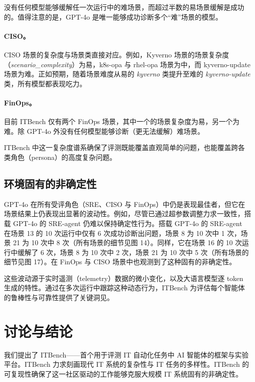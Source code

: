 没有任何模型能够缓解任一次运行中的难场景，而超过半数的易场景缓解是成功的。值得注意的是，GPT-4o 是唯一能够成功诊断多个“难”场景的模型。

\paragraph{CISO。} CISO 场景的复杂度与场景类直接对应。例如，Kyverno 场景的场景复杂度（\textit{scenario\_complexity}）为易，k8s-opa 与 rhel-opa 场景为中，而 kyverno-update 场景为难。正如预期，随着场景难度从易的 \textit{kyverno} 类提升至难的 \textit{kyverno-update} 类，所有模型都表现吃力。

\paragraph{FinOps。} 目前 ITBench 仅有两个 FinOps 场景，其中一个的场景复杂度为易，另一个为难。除 GPT-4o 外没有任何模型能够诊断（更无法缓解）难场景。

ITBench 中这一复杂度谱系确保了评测既能覆盖直观简单的问题，也能覆盖跨各类角色（persona）的高度复杂问题。

\subsection{环境固有的非确定性}

GPT-4o 在所有受评角色（SRE、CISO 与 FinOps）中仍是表现最佳者，但它在场景结果上仍表现出显著的波动性。例如，尽管已通过超参数调整力求一致性，搭载 GPT-4o 的 SRE-agent 仍难以保持确定性行为。搭载 GPT-4o 的 SRE-agent 在场景 13 的 10 次运行中仅有 6 次成功诊断出问题，场景 8 为 10 次中 1 次，场景 21 为 10 次中 8 次（所有场景的细节见图 14）。同样，它在场景 16 的 10 次运行中缓解了 6 次，场景 8 为 10 次中 2 次，场景 21 为 10 次中 5 次（所有场景的细节见图 17）。在 FinOps 与 CISO 场景中也观测到了这种固有的非确定性。

这些波动源于实时遥测（telemetry）数据的微小变化，以及大语言模型逐 token 生成的特性。通过在多次运行中跟踪这种动态行为，ITBench 为评估每个智能体的鲁棒性与可靠性提供了关键洞见。

\section{讨论与结论}

我们提出了 ITBench——首个用于评测 IT 自动化任务中 AI 智能体的框架与实验平台。ITBench 力求刻画现代 IT 系统的复杂性与 IT 任务的多样性。ITBench 的可复现性确保了这一社区驱动的工作能够克服大规模 IT 系统固有的非确定性。

